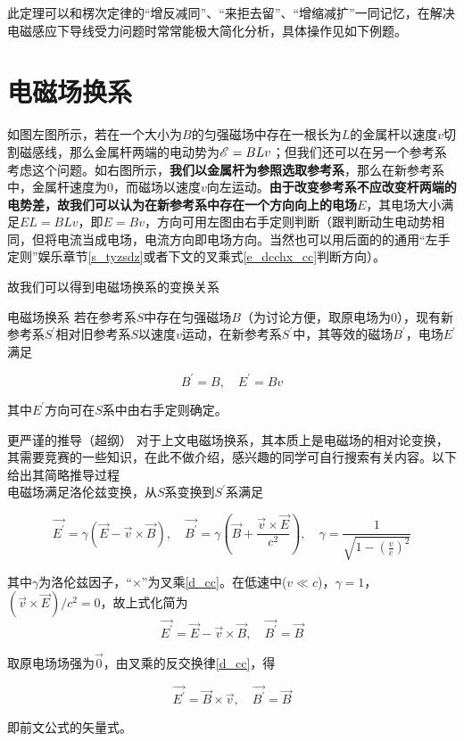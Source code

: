 此定理可以和楞次定律的“增反减同”、“来拒去留”、“增缩减扩”一同记忆，在解决电磁感应下导线受力问题时常常能极大简化分析，具体操作见如下例题。

\section{电磁场换系}
\label{s_dcchx}



如图左图所示，若在一个大小为$B$的匀强磁场中存在一根长为$L$的金属杆以速度$v$切割磁感线，那么金属杆两端的电动势为$\mathscr{E} = B L v$；但我们还可以在另一个参考系考虑这个问题。如右图所示，\textbf{我们以金属杆为参照选取参考系}，那么在新参考系中，金属杆速度为$0$，而磁场以速度$v$向左运动。\textbf{由于改变参考系不应改变杆两端的电势差，故我们可以认为在新参考系中存在一个方向向上的电场$E$}，其电场大小满足$E L = B L v$，即$E = B v$，方向可用左图由右手定则判断（跟判断动生电动势相同，但将电流当成电场，电流方向即电场方向。当然也可以用后面的的通用“左手定则”娱乐章节\eqref{s_tyzsdz}或者下文的叉乘式\eqref{e_dcchx_cc}判断方向）。

故我们可以得到电磁场换系的变换关系

\begin{theo}[label=d_dcchx]{电磁场换系}{}
若在参考系$S$中存在匀强磁场$B$（为讨论方便，取原电场为0），现有新参考系$S^{\prime}$相对旧参考系$S$以速度$v$运动，在新参考系$S^{\prime}$中，其等效的磁场$B^{\prime}$，电场$E^{\prime}$满足

$$B^{\prime} = B, \quad E^{\prime} = B v$$

其中$E^{\prime}$方向可在$S$系中由右手定则确定。

\end{theo}

\begin{mk}{更严谨的推导（超纲）}{}
对于上文电磁场换系，其本质上是电磁场的相对论变换，其需要竞赛的一些知识，在此不做介绍，感兴趣的同学可自行搜索有关内容。以下给出其简略推导过程
~\\

电磁场满足洛伦兹变换，从$S$系变换到$S^{\prime}$系满足

$$\vec{E^{\prime}} = \gamma (\vec{E} - \vec{v} \times \vec{B}), \quad \vec{B^{\prime}} = \gamma (\vec{B} +\frac{\vec{v} \times \vec{E}}{c^2}), \quad \gamma = \frac{1}{\sqrt{1-(\frac{v}{c})^2}}$$

其中$\gamma$为洛伦兹因子，“$\times$”为叉乘\eqref{d_cc}。在低速中($v \ll c$)，$\gamma = 1$，$(\vec{v} \times \vec{E})/c^2 = 0$，故上式化简为
$$\vec{E^{\prime}} = \vec{E} - \vec{v} \times \vec{B}, \quad \vec{B^{\prime}} = \vec{B}$$

取原电场场强为$\vec{0}$，由叉乘的反交换律\eqref{d_cc}，得

\begin{equation}
\label{e_dcchx_cc}
\boxed{\vec{E^{\prime}} = \vec{B} \times \vec{v}, \quad \vec{B^{\prime}} = \vec{B}}
\end{equation}

即前文公式的矢量式。
\end{mk}

